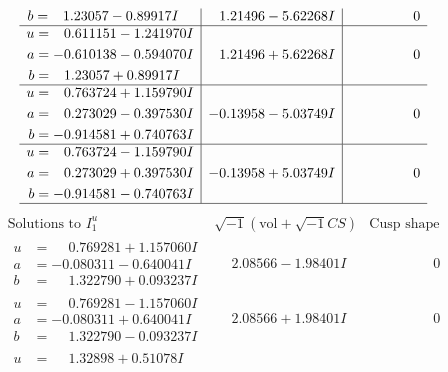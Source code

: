 \documentclass[1p]{elsarticle_modified}
\theoremstyle{definition}
\newcommand{\I}{\sqrt{-1}}
\begin{document}
$$\begin{array}{c|c|c}
\begin{aligned}
b &= \phantom{-}1.23057 - 0.89917 I\end{aligned}
 & \phantom{-}1.21496 - 5.62268 I & \phantom{-0.000000 } 0 \\ \hline\begin{aligned}
u &= \phantom{-}0.611151 - 1.241970 I \\
a &= -0.610138 - 0.594070 I \\
b &= \phantom{-}1.23057 + 0.89917 I\end{aligned}
 & \phantom{-}1.21496 + 5.62268 I & \phantom{-0.000000 } 0 \\ \hline\begin{aligned}
u &= \phantom{-}0.763724 + 1.159790 I \\
a &= \phantom{-}0.273029 - 0.397530 I \\
b &= -0.914581 + 0.740763 I\end{aligned}
 & -0.13958 - 5.03749 I & \phantom{-0.000000 } 0 \\ \hline\begin{aligned}
u &= \phantom{-}0.763724 - 1.159790 I \\
a &= \phantom{-}0.273029 + 0.397530 I \\
b &= -0.914581 - 0.740763 I\end{aligned}
 & -0.13958 + 5.03749 I & \phantom{-0.000000 } 0\\
 \hline 
 \end{array}$$\newpage$$\begin{array}{c|c|c}  
\text{Solutions to }I^u_{1}& \I (\text{vol} + \sqrt{-1}CS) & \text{Cusp shape}\\
 \hline 
\begin{aligned}
u &= \phantom{-}0.769281 + 1.157060 I \\
a &= -0.080311 - 0.640041 I \\
b &= \phantom{-}1.322790 + 0.093237 I\end{aligned}
 & \phantom{-}2.08566 - 1.98401 I & \phantom{-0.000000 } 0 \\ \hline\begin{aligned}
u &= \phantom{-}0.769281 - 1.157060 I \\
a &= -0.080311 + 0.640041 I \\
b &= \phantom{-}1.322790 - 0.093237 I\end{aligned}
 & \phantom{-}2.08566 + 1.98401 I & \phantom{-0.000000 } 0 \\ \hline\begin{aligned}
u &= \phantom{-}1.32898 + 0.51078 I \\

\end{aligned}
\end{array}$$
\end{document}
